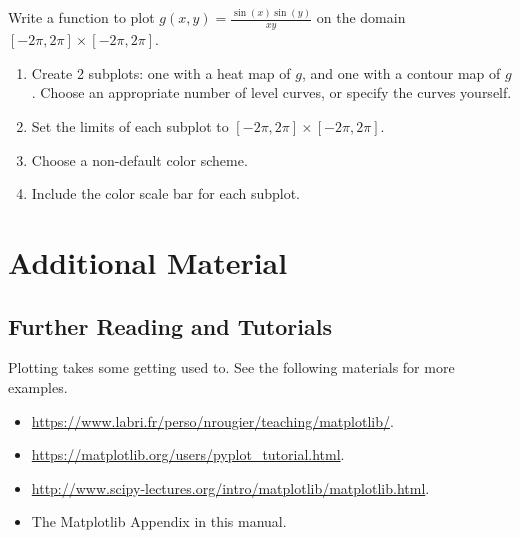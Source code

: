 \begin{problem} %
\label{prob:heatmap}
Write a function to plot $g(x,y) = \frac{\sin(x)\sin(y)}{xy}$ on the domain $[-2\pi,2\pi] \times [-2\pi,2\pi]$.

\begin{enumerate}
\item Create 2 subplots: one with a heat map of $g$, and one with a contour map of $g$.
Choose an appropriate number of level curves, or specify the curves yourself.
\item Set the limits of each subplot to $[-2\pi,2\pi] \times [-2\pi,2\pi]$.
\item Choose a non-default color scheme.
\item Include the color scale bar for each subplot.
\end{enumerate}
\end{problem}

\newpage

\section*{Additional Material} %

\subsection*{Further Reading and Tutorials} %

Plotting takes some getting used to.
See the following materials for more examples.
\begin{itemize}
    \item \url{https://www.labri.fr/perso/nrougier/teaching/matplotlib/}.
    \item \url{https://matplotlib.org/users/pyplot_tutorial.html}.
    \item \url{http://www.scipy-lectures.org/intro/matplotlib/matplotlib.html}.
    \item The Matplotlib Appendix in this manual.
\end{itemize}

